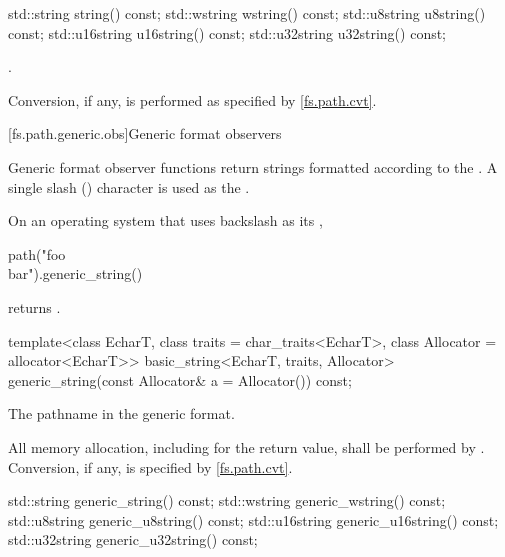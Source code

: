 %
%
%
%
%
\begin{itemdecl}
std::string string() const;
std::wstring wstring() const;
std::u8string u8string() const;
std::u16string u16string() const;
std::u32string u32string() const;
\end{itemdecl}

\begin{itemdescr}
\pnum
\returns
{}.

\pnum
\remarks
Conversion, if any, is performed as specified
by \ref{fs.path.cvt}.
\end{itemdescr}


[fs.path.generic.obs]{Generic format observers}

\pnum
Generic format observer functions return strings formatted according to the
.
A single slash () character is used as
the .

\pnum
\begin{example}
On an operating system that uses backslash as
its ,
\begin{codeblock}
path("foo\\bar").generic_string()
\end{codeblock}
returns .
\end{example}

%
\begin{itemdecl}
template<class EcharT, class traits = char_traits<EcharT>,
         class Allocator = allocator<EcharT>>
  basic_string<EcharT, traits, Allocator>
    generic_string(const Allocator& a = Allocator()) const;
\end{itemdecl}

\begin{itemdescr}
\pnum
\returns
The pathname in the generic format.

\pnum
\remarks
All memory allocation, including for the return value, shall
be performed by . Conversion, if any, is specified by
\ref{fs.path.cvt}.
\end{itemdescr}

%
%
%
%
%
\begin{itemdecl}
std::string generic_string() const;
std::wstring generic_wstring() const;
std::u8string generic_u8string() const;
std::u16string generic_u16string() const;
std::u32string generic_u32string() const;
\end{itemdecl}

